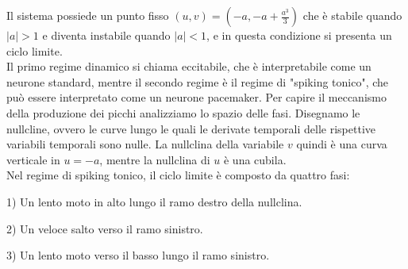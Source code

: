 \documentclass[12pt]{article}
\begin{document}
Il sistema possiede un punto fisso $(u,v) = \left(-a,-a+\frac{a^3}{3} \right) $ che è stabile quando $|a|>1$ e diventa instabile quando $|a|<1$, e in questa condizione si presenta un ciclo limite. \\
Il primo regime dinamico si chiama eccitabile, che è interpretabile come un neurone standard, mentre il secondo regime è il regime di "spiking tonico", che può essere interpretato come un neurone pacemaker. Per capire il meccanismo della produzione dei picchi analizziamo lo spazio delle fasi. Disegnamo le nullcline, ovvero le curve lungo le quali le derivate temporali delle rispettive variabili temporali sono nulle. La nullclina della variabile $v$ quindi è una curva verticale in $u = -a$, mentre la nullclina di $u$ è una cubila. \\
Nel regime di spiking tonico, il ciclo limite è composto da quattro fasi:

1) Un lento moto in alto lungo il ramo destro della nullclina. 

2) Un veloce salto verso il ramo sinistro.

3) Un lento moto verso il basso lungo il ramo sinistro. 
\end{document}
